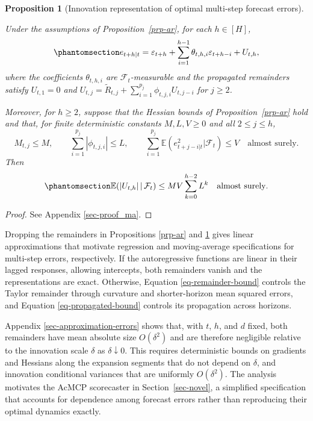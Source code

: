 \documentclass[
  american,
  12pt]{article}
\theoremstyle{plain}
\theoremstyle{plain}
\newtheorem{proposition}{Proposition}[section]
\theoremstyle{remark}
\begin{document}
\begin{proposition}[Innovation representation of optimal multi-step
forecast errors]\protect\hypertarget{prp-ma}{}\label{prp-ma}

Under the assumptions of Proposition~\ref{prp-ar}, for each \(h\in[H]\),
\begin{equation}\phantomsection\label{eq-ma}{
e_{t+h|t}=\varepsilon_{t+h}+
\sum_{i=1}^{h-1}\theta_{t,h,i}\varepsilon_{t+h-i}+U_{t,h},
}\end{equation} where the coefficients \(\theta_{t,h,i}\) are
\(\mathcal F_t\)-measurable and the propagated remainders satisfy
\(U_{t,1}=0\) and
\(U_{t,j}=\widetilde R_{t,j}+\sum_{i=1}^{p_j}\phi_{t,j,i}U_{t,j-i}\) for
\(j\geq2\).

Moreover, for \(h\geq2\), suppose that the Hessian bounds of
Proposition~\ref{prp-ar} hold and that, for finite deterministic
constants \(M,L,V\geq0\) and all \(2\leq j\leq h\), \[
M_{t,j}\leq M,\qquad
\sum_{i=1}^{p_j}|\phi_{t,j,i}|\leq L,
\qquad \sum_{i=1}^{p_j}\mathbb E(e_{t+j-i|t}^2|\mathcal F_t)\leq V\quad\text{almost surely}.
\] Then \begin{equation}\phantomsection\label{eq-propagated-bound}{
\mathbb E\!\left(|U_{t,h}|\,|\,\mathcal F_t\right)
\leq MV\sum_{k=0}^{h-2}L^k\quad\text{almost surely}.
}\end{equation}

\end{proposition}

\begin{proof}
See Appendix \ref{sec-proof_ma}.
\end{proof}

Dropping the remainders in Propositions \ref{prp-ar} and \ref{prp-ma}
gives linear approximations that motivate regression and moving-average
specifications for multi-step errors, respectively. If the
autoregressive functions are linear in their lagged responses, allowing
intercepts, both remainders vanish and the representations are exact.
Otherwise, Equation \eqref{eq-remainder-bound} controls the Taylor
remainder through curvature and shorter-horizon mean squared errors, and
Equation \eqref{eq-propagated-bound} controls its propagation across
horizons.

Appendix \ref{sec-approximation-errors} shows that, with \(t\), \(h\),
and \(d\) fixed, both remainders have mean absolute size \(O(\delta^2)\)
and are therefore negligible relative to the innovation scale \(\delta\)
as \(\delta\downarrow0\). This requires deterministic bounds on
gradients and Hessians along the expansion segments that do not depend
on \(\delta\), and innovation conditional variances that are uniformly
\(O(\delta^2)\). The analysis motivates the AcMCP scorecaster in
Section~\ref{sec-novel}, a simplified specification that accounts for
dependence among forecast errors rather than reproducing their optimal
dynamics exactly.
\end{document}
